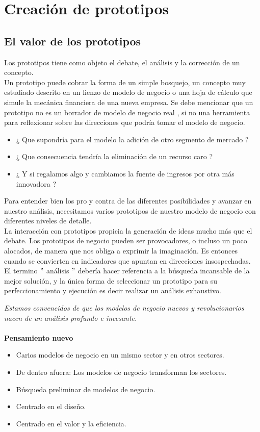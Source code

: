 \documentclass[11pt]{book}
\begin{document}
\chapter{Creación de prototipos}
\section{El valor de los prototipos}
Los prototipos tiene como objeto el debate, el análisis y la corrección de un concepto.\\
Un prototipo puede cobrar la forma de un simple bosquejo, un concepto muy estudiado descrito en un lienzo de modelo de negocio o una hoja de cálculo que simule la mecánica financiera de una nueva empresa.
Se debe mencionar que un prototipo no es un borrador de modelo de negocio real , si no una herramienta para reflexionar sobre las direcciones que podría tomar el modelo de negocio.
\begin{itemize}
\item ¿ Que supondría para el modelo la adición de otro segmento de mercado ?
\item ¿ Que consecuencia tendría la eliminación de un recurso caro ?
\item ¿ Y si regalamos algo y cambiamos la fuente de ingresos por otra más innovadora ?
\end{itemize}
Para entender bien los pro y contra de las diferentes posibilidades y avanzar en nuestro análisis, necesitamos varios prototipos de nuestro modelo de negocio con diferentes niveles de detalle.\\
La interacción con prototipos propicia la generación de ideas mucho más que el debate. Los prototipos de negocio pueden ser provocadores, o incluso un poco alocados, de manera que nos obliga a exprimir la imaginación. Es entonces cuando se convierten en indicadores que apuntan en direcciones insospechadas. \\
El termino $"$ análisis $"$ debería hacer referencia a la búsqueda incansable de la mejor solución, y la única forma de seleccionar un prototipo para su perfeccionamiento y ejecución es decir realizar un análisis exhaustivo.\\ \vspace{0.2cm}

\textit{Estamos convencidos de que los modelos de negocio nuevos y revolucionarios nacen de un análisis profundo e incesante.}\\\\
\textbf{Pensamiento nuevo}
\begin{itemize}
\item Carios modelos de negocio en un mismo sector y en otros sectores.
\item De dentro afuera: Los modelos de negocio transforman los sectores.
\item Búsqueda preliminar de modelos de negocio.
\item Centrado en el diseño.
\item Centrado en el valor y la eficiencia. 
\end{itemize}
\end{document}
